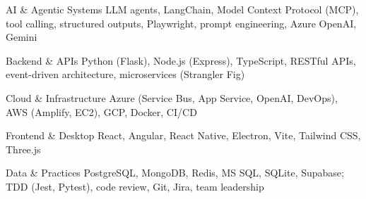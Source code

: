 
\begin{cvskills}
  \cvskill
    {AI \& Agentic Systems}
    {LLM agents, LangChain, Model Context Protocol (MCP), tool calling, structured outputs, Playwright, prompt engineering, Azure OpenAI, Gemini}

  \cvskill
    {Backend \& APIs}
    {Python (Flask), Node.js (Express), TypeScript, RESTful APIs, event-driven architecture, microservices (Strangler Fig)}

  \cvskill
    {Cloud \& Infrastructure}
    {Azure (Service Bus, App Service, OpenAI, DevOps), AWS (Amplify, EC2), GCP, Docker, CI/CD}

  \cvskill
    {Frontend \& Desktop}
    {React, Angular, React Native, Electron, Vite, Tailwind CSS, Three.js}

  \cvskill
    {Data \& Practices}
    {PostgreSQL, MongoDB, Redis, MS SQL, SQLite, Supabase; TDD (Jest, Pytest), code review, Git, Jira, team leadership}
\end{cvskills}
